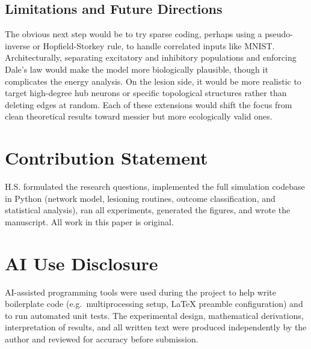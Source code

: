 \documentclass[11pt,a4paper]{article}
\begin{document}
\subsection{Limitations and Future Directions}

The obvious next step would be to try sparse coding, perhaps using a pseudo-inverse or Hopfield-Storkey rule, to handle correlated inputs like MNIST. Architecturally, separating excitatory and inhibitory populations and enforcing Dale's law would make the model more biologically plausible, though it complicates the energy analysis. On the lesion side, it would be more realistic to target high-degree hub neurons or specific topological structures rather than deleting edges at random. Each of these extensions would shift the focus from clean theoretical results toward messier but more ecologically valid ones.

\section{Contribution Statement}

\noindent H.S. formulated the research questions, implemented the full simulation codebase in Python (network model, lesioning routines, outcome classification, and statistical analysis), ran all experiments, generated the figures, and wrote the manuscript. All work in this paper is original.

\section{AI Use Disclosure}

\noindent AI-assisted programming tools were used during the project to help write boilerplate code (e.g.\ multiprocessing setup, LaTeX preamble configuration) and to run automated unit tests. The experimental design, mathematical derivations, interpretation of results, and all written text were produced independently by the author and reviewed for accuracy before submission.
\end{document}
